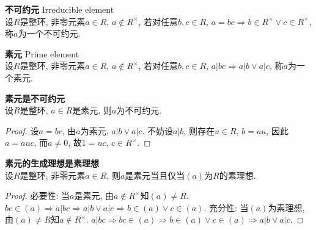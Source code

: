 \begin{dfn} \textbf{不可约元} Irreducible element\\
设$R$是整环, 非零元素$a\in R$, $a\notin R^\times$, 若对任意$b,c\in R$, $a=bc \Rightarrow b\in R^\times \lor c\in R^\times$, 称$a$为一个不可约元. 
\end{dfn}

\begin{dfn} \textbf{素元} Prime element\\
设$R$是整环, 非零元素$a\in R$, $a\notin R^\times$, 若对任意$b,c\in R$, $a\vert bc \Rightarrow a\vert b \lor a\vert c$, 称$a$为一个素元. 
\end{dfn}

\begin{pro} \textbf{素元是不可约元}\\
设$R$是整环, $a\in R$是素元, 则$a$为不可约元.
\end{pro}
\begin{proof}
设$a=bc$, 由$a$为素元, $a|b \lor a|c$. 不妨设$a|b$, 则存在$u\in R$, $b=au$, 因此$a=auc$, 而$a\neq 0$, 故$1=uc$, $c\in R^\times$. 
\end{proof}

\begin{pro} \textbf{素元的生成理想是素理想}\\
设$R$是整环, 非零元素$a\in R$, 则$a$是素元当且仅当$(a)$为$R$的素理想.
\end{pro}
\begin{proof}
必要性: 当$a$是素元, 由$a\notin R^\times$知$(a)\neq R$. $bc \in (a) \Rightarrow a|bc \Rightarrow a|b \lor a|c \Rightarrow b\in (a) \lor c \in (a)$. 充分性: 当$(a)$为素理想, 由$(a)\neq R$知$a\notin R^\times$. $a|bc \Rightarrow bc \in (a) \Rightarrow b \in (a) \lor c \in (a) \Rightarrow a|b \lor a|c$.
\end{proof}


